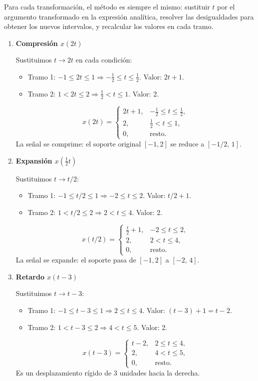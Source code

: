 \documentclass[10pt,a4paper]{article}
\begin{document}
	Para cada transformación, el método es siempre el mismo: sustituir $t$ por el argumento transformado en la expresión analítica, resolver las desigualdades para obtener los nuevos intervalos, y recalcular los valores en cada tramo.
	
	\begin{enumerate}[label=\textbf{\alph*)}]
		\item \textbf{Compresión $x(2t)$}
		
		Sustituimos $t \to 2t$ en cada condición:
		\begin{itemize}
		    \item Tramo 1: $-1\leq 2t\leq 1 \Rightarrow -\frac{1}{2}\leq t\leq \frac{1}{2}$. Valor: $2t+1$.
		    \item Tramo 2: $1<2t\leq 2 \Rightarrow \frac{1}{2}<t\leq 1$. Valor: $2$.
		\end{itemize}
		\[
		x(2t) =
		\begin{cases}
		2t+1, & -\frac{1}{2}\leq t\leq \frac{1}{2}, \\
		2, & \frac{1}{2}<t\leq 1, \\
		0, & \text{resto.}
		\end{cases}
		\]
		La señal se comprime: el soporte original $[-1,2]$ se reduce a $[-1/2,\, 1]$.
		
		\item \textbf{Expansión $x\!\left(\frac{1}{2}t\right)$}
		
		Sustituimos $t \to t/2$:
		\begin{itemize}
		    \item Tramo 1: $-1\leq t/2\leq 1 \Rightarrow -2\leq t\leq 2$. Valor: $t/2+1$.
		    \item Tramo 2: $1<t/2\leq 2 \Rightarrow 2<t\leq 4$. Valor: $2$.
		\end{itemize}
		\[
		x(t/2) =
		\begin{cases}
		\frac{t}{2}+1, & -2\leq t\leq 2, \\
		2, & 2<t\leq 4, \\
		0, & \text{resto.}
		\end{cases}
		\]
		La señal se expande: el soporte pasa de $[-1,2]$ a $[-2,\, 4]$.
		
		\item \textbf{Retardo $x(t-3)$}
		
		Sustituimos $t \to t-3$:
		\begin{itemize}
		    \item Tramo 1: $-1\leq t-3\leq 1 \Rightarrow 2\leq t\leq 4$. Valor: $(t-3)+1 = t-2$.
		    \item Tramo 2: $1<t-3\leq 2 \Rightarrow 4<t\leq 5$. Valor: $2$.
		\end{itemize}
		\[
		x(t-3) =
		\begin{cases}
		t-2, & 2\leq t\leq 4, \\
		2, & 4<t\leq 5, \\
		0, & \text{resto.}
		\end{cases}
		\]
		Es un desplazamiento rígido de $3$ unidades hacia la derecha.
		

\end{enumerate}
\end{document}
